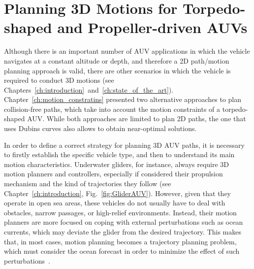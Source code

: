 
\chapter{Planning 3D Motions for Torpedo-shaped and Propeller-driven AUVs}
\label{ch:planning_3D} %



\ifpdf
    \graphicspath{{4_planning_3D/figures/PNG/}{4_planning_3D/figures/PDF/}{4_planning_3D/figures/}}
\else
    \graphicspath{{4_planning_3D/figures/EPS/}{4_planning_3D/figures/}}
\fi


Although there is an important number of \ac{AUV} applications in which the
vehicle navigates at a constant altitude or depth, and therefore a \ac{2D}
path/motion planning approach is valid, there are other scenarios in which the
vehicle is required to conduct \ac{3D} motions (see
Chapters~\ref{ch:introduction}~and~\ref{ch:state_of_the_art}).
Chapter~\ref{ch:motion_constratins} presented two alternative approaches to plan
collision-free paths, which take into account the motion constraints of a
torpedo-shaped \ac{AUV}. While both approaches are limited to plan \ac{2D}
paths, the one that uses Dubins curves also allows to obtain near-optimal
solutions.

In order to define a correct strategy for planning \ac{3D} \ac{AUV} paths, it is
necessary to firstly establish the specific vehicle type, and then to understand
its main motion characteristics. Underwater gliders, for instance, always
require \ac{3D} motion planners and controllers, especially if considered their
propulsion mechanism and the kind of trajectories they follow (see
Chapter~\ref{ch:introduction}, Fig.~\ref{fig:GliderAUV}). However, given that
they operate in open sea areas, these vehicles do not usually have to deal with
obstacles, narrow passages, or high-relief environments. Instead, their motion
planners are more focused on coping with external perturbations such as ocean
currents, which may deviate the glider from the desired trajectory. This makes
that, in most cases, motion planning becomes a trajectory planning problem,
which must consider the ocean forecast in order to minimize the effect of such
perturbations~\cite{Smith2010,Thompson2010}.


